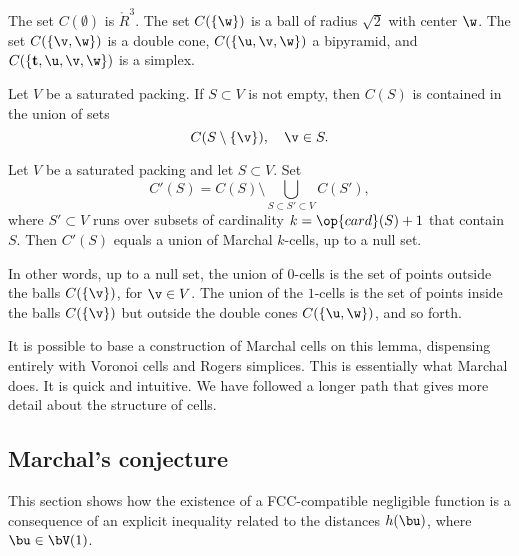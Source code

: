 The set $C(\emptyset)$ is $\ring{R}^3$.  The set $C(\{\w\})$ is a ball
of radius $\sqrt2$ with center $\w$.  The set $C(\{\v,\w\})$ is a
double cone, $C(\{\u,\v,\w\})$ a bipyramid, and $C(\{{\mathbf
  t},\u,\v,\w\})$ is a simplex.

\begin{lemma}
Let $V$ be a saturated packing.
If $S\subset V$ is not empty, then $C(S)$ is contained in the union of sets
\[
C(S\setminus \{\v\}),  \quad \v\in S.
\]
\end{lemma}

\begin{lemma}
Let $V$ be a saturated packing and let $S\subset V$. 
Set
\[C'(S) = C(S) \setminus \bigcup_{S\subset S'\subset V} C(S'),\] where
$S'\subset V$ runs over subsets of cardinality $k=\op{card}(S)+1$ that
contain $S$.  Then $C'(S)$ equals a union of Marchal $k$-cells,
up to a null set.
\end{lemma}

In other words, up to a null set, the union of $0$-cells is the set of points
outside the balls $C(\{\v\})$, for $\v\in V$.  The union of the $1$-cells
is the set of points inside the balls $C(\{\v\})$ but outside the double cones
$C(\{\u,\w\})$, and so forth.

It is possible to base a construction of Marchal cells on this lemma,
dispensing entirely with Voronoi cells and Rogers simplices.  This is
essentially what Marchal does.  It is quick and intuitive.  We have
followed a longer path that gives more detail about the structure of
cells.





\subsection{Marchal's conjecture}

This section shows how the existence of a FCC-compatible negligible
function is a consequence of an explicit
inequality related to the distances $h(\bu)$, where $\bu\in \bV(1)$.

